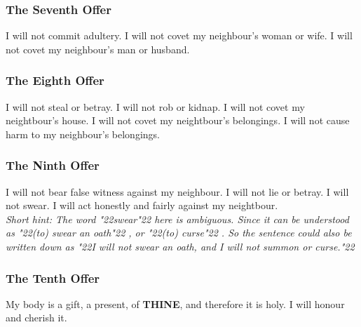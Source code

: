 \documentclass[10pt,a5paper]{article}
\newcommand{\Thine}[0]{\textbf{THINE}}
\newcommand{\q}[1]{\char"22{#1}\char"22 }
\begin{document}
	\subsubsection{The Seventh Offer}
		I will not commit adultery.
		I will not covet my neighbour's woman or wife.
		I will not covet my neighbour's man or husband.
		
	\subsubsection{The Eighth Offer}
		I will not steal or betray.
		I will not rob or kidnap.
		I will not covet my neightbour's house.
		I will not covet my neightbour's belongings.
		I will not cause harm to my neighbour's belongings.
		
	\subsubsection{The Ninth Offer} \label{TheNinthOffer}
		I will not bear false witness against my neighbour.
		I will not lie or betray.
		I will not swear.
		I will act honestly and fairly against my neightbour.
		\\
		\textit{Short hint:
		The word \q{swear} here is ambiguous.
		Since it can be understood as \q{(to) swear an oath},
		or \q{(to) curse}.
		So the sentence could also be written down as
		\q{I will not swear an oath, and I will not summon or curse.}}
		
	\subsubsection{The Tenth Offer} \label{TheTenthOffer}
		My body is a gift, a present, of {\Thine},
		and therefore it is holy.
		I will honour and cherish it.
	
\end{document}
